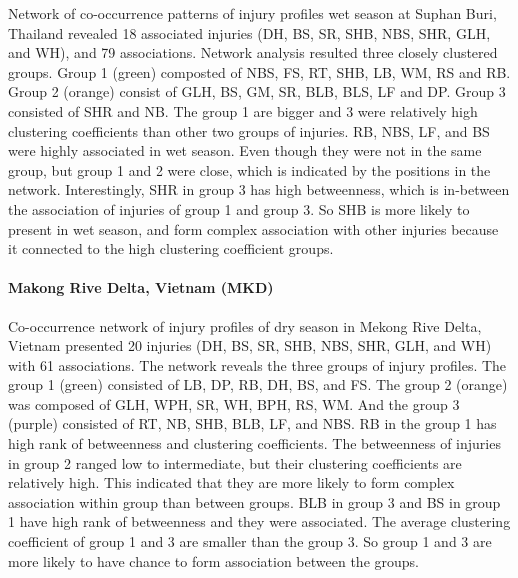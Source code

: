 Network of co-occurrence patterns of injury profiles wet season at Suphan Buri, Thailand revealed 18 associated injuries (DH, BS, SR, SHB, NBS, SHR, GLH, and WH), and 79 associations. Network analysis resulted three closely clustered groups. Group 1 (green) composted of NBS, FS, RT, SHB, LB, WM, RS and RB. Group 2 (orange) consist of GLH, BS, GM, SR, BLB, BLS, LF and DP. Group 3 consisted of SHR and NB. The group 1 are bigger and 3 were relatively high clustering coefficients than other two groups of injuries. RB, NBS, LF, and BS were highly associated in wet season. Even though they were not in the same group, but group 1 and 2 were close, which is indicated by the positions in the network. Interestingly, SHR in group 3 has high betweenness, which is in-between the association of injuries of group 1 and group 3. So SHB is more likely to present in wet season, and form complex association with other injuries because it connected to the high clustering coefficient groups.

\newpage

\paragraph{Makong Rive Delta, Vietnam (MKD)}

Co-occurrence network of injury profiles of dry season in Mekong Rive Delta, Vietnam presented 20 injuries (DH, BS, SR, SHB, NBS, SHR, GLH, and WH) with 61 associations. The network reveals the three groups of injury profiles. The group 1 (green) consisted of LB, DP, RB, DH, BS, and FS. The group 2 (orange) was composed of GLH, WPH, SR, WH, BPH, RS, WM. And the group 3 (purple) consisted of RT, NB, SHB, BLB, LF, and NBS. RB in the group 1 has high rank of betweenness and clustering coefficients. The betweenness of injuries in group 2 ranged low to intermediate, but their clustering coefficients are relatively high. This indicated that they are more likely to form complex association within group than between groups. BLB in group 3 and BS in group 1 have high rank of betweenness and they were associated. The average clustering coefficient of group 1 and 3 are smaller than the group 3. So group 1 and 3 are more likely to have chance to form association between the groups.

